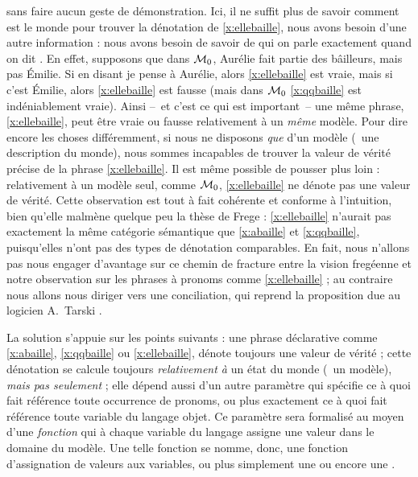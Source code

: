 sans faire aucun geste de démonstration.  Ici, il ne suffit plus de
savoir comment est le monde pour trouver la dénotation de
\ref{x:ellebaille}, nous avons besoin d'une autre information : nous avons besoin
de savoir de qui on parle exactement quand on dit .
En effet, supposons que dans $\mathcal{M}_0$, Aurélie fait partie des
bâilleurs, mais pas Émilie.  Si en disant  je pense
à  Aurélie,
alors \ref{x:ellebaille} est vraie, mais si  c'est
Émilie, alors \ref{x:ellebaille} est fausse (mais dans $\mathcal{M}_0$
\ref{x:qqbaille} est indéniablement vraie).  Ainsi --~et c'est ce
qui est important~-- une même phrase, \ref{x:ellebaille}, peut être
vraie ou fausse relativement à un \emph{même} modèle.
Pour dire encore les choses différemment, si nous ne disposons \emph{que} d'un
modèle (\ie\ une description du monde), nous sommes incapables de trouver la valeur de
vérité précise de la phrase \ref{x:ellebaille}.  Il est  même possible de
pousser plus loin : relativement à un modèle seul, comme  $\mathcal{M}_0$,
\ref{x:ellebaille} ne dénote pas une valeur de vérité.  Cette
observation est tout à fait cohérente et conforme à l'intuition, bien
qu'elle malmène quelque peu la thèse de Frege : \ref{x:ellebaille}
n'aurait pas exactement la même catégorie sémantique que
\ref{x:abaille} et \ref{x:qqbaille}, puisqu'elles n'ont pas des
types de dénotation comparables.
En fait, nous n'allons pas nous engager d'avantage sur ce chemin de
fracture entre la vision fregéenne et notre observation sur les
phrases à pronoms comme \ref{x:ellebaille} ; au contraire nous allons 
nous diriger vers une conciliation, qui reprend la proposition due au
logicien A.~Tarski \citep{Tarski:44}.


La solution s'appuie sur les points suivants : une phrase déclarative
comme \ref{x:abaille}, \ref{x:qqbaille} ou \ref{x:ellebaille},
dénote toujours une valeur de vérité ; cette dénotation se calcule
toujours \emph{relativement à} un
état du monde (\ie\ un modèle), \emph{mais pas seulement} ; elle dépend
aussi d'un autre paramètre qui spécifie ce à quoi fait référence
toute occurrence de pronoms, ou plus exactement ce à quoi fait
référence toute variable du langage objet.   Ce paramètre sera
formalisé au moyen d'une \emph{fonction} qui à chaque variable du
langage assigne une valeur dans le domaine du modèle.
Une telle fonction se nomme, donc, une fonction d'assignation de
valeurs aux variables, ou plus simplement une  ou encore
une .%


